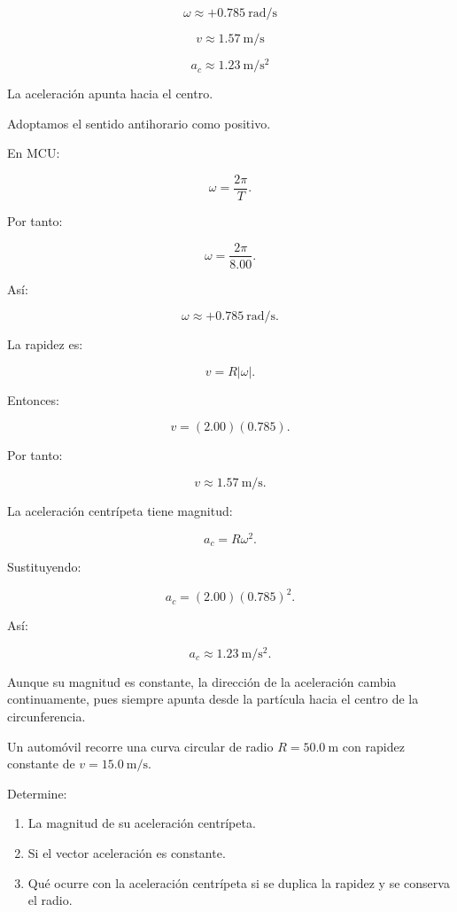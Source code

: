 \begin{respuesta}
\[
\boxed{\omega\approx+\SI{0.785}{\radian\per\second}}
\]

\[
\boxed{v\approx\SI{1.57}{\meter\per\second}}
\]

\[
\boxed{a_c\approx\SI{1.23}{\meter\per\second\squared}}
\]

La aceleración apunta hacia el centro.
\end{respuesta}

\begin{explicacion}
Adoptamos el sentido antihorario como positivo.

En MCU:

\[
\omega=\frac{2\pi}{T}.
\]

Por tanto:

\[
\omega=\frac{2\pi}{8.00}.
\]

Así:

\[
\boxed{\omega\approx+\SI{0.785}{\radian\per\second}}.
\]

La rapidez es:

\[
v=R|\omega|.
\]

Entonces:

\[
v=(2.00)(0.785).
\]

Por tanto:

\[
\boxed{v\approx\SI{1.57}{\meter\per\second}}.
\]

La aceleración centrípeta tiene magnitud:

\[
a_c=R\omega^2.
\]

Sustituyendo:

\[
a_c=(2.00)(0.785)^2.
\]

Así:

\[
\boxed{a_c\approx\SI{1.23}{\meter\per\second\squared}}.
\]

Aunque su magnitud es constante, la dirección de la aceleración
cambia continuamente, pues siempre apunta desde la partícula
hacia el centro de la circunferencia.
\end{explicacion}


\begin{ejercicio}
Un automóvil recorre una curva circular de radio
\(R=\SI{50.0}{\meter}\) con rapidez constante de
\(v=\SI{15.0}{\meter\per\second}\).

Determine:

\begin{enumerate}[label=\alph*)]
    \item La magnitud de su aceleración centrípeta.
    \item Si el vector aceleración es constante.
    \item Qué ocurre con la aceleración centrípeta si se duplica
    la rapidez y se conserva el radio.
\end{enumerate}
\end{ejercicio}

